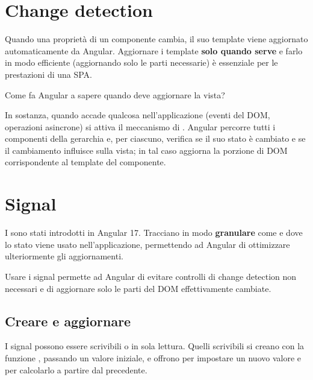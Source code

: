 \section{Change detection}

Quando una proprietà di un componente cambia, il suo template viene aggiornato
automaticamente da Angular. Aggiornare i template \textbf{solo quando serve} e
farlo in modo efficiente (aggiornando solo le parti necessarie) è essenziale per
le prestazioni di una SPA.

Come fa Angular a sapere quando deve aggiornare la vista?

In sostanza, quando accade qualcosa nell'applicazione (eventi del DOM,
operazioni asincrone) si attiva il meccanismo di .
Angular percorre tutti i componenti della gerarchia e, per ciascuno, verifica se
il suo stato è cambiato e se il cambiamento influisce sulla vista; in tal caso
aggiorna la porzione di DOM corrispondente al template del componente.

\section{Signal}

I  sono stati introdotti in Angular 17. Tracciano in modo
\textbf{granulare} come e dove lo stato viene usato nell'applicazione,
permettendo ad Angular di ottimizzare ulteriormente gli aggiornamenti.


Usare i signal permette ad Angular di evitare controlli di change detection non
necessari e di aggiornare solo le parti del DOM effettivamente cambiate.

\subsection{Creare e aggiornare}

I signal possono essere scrivibili o in sola lettura. Quelli scrivibili si
creano con la funzione , passando un valore iniziale, e offrono
 per impostare un nuovo valore e  per calcolarlo a
partire dal precedente.

